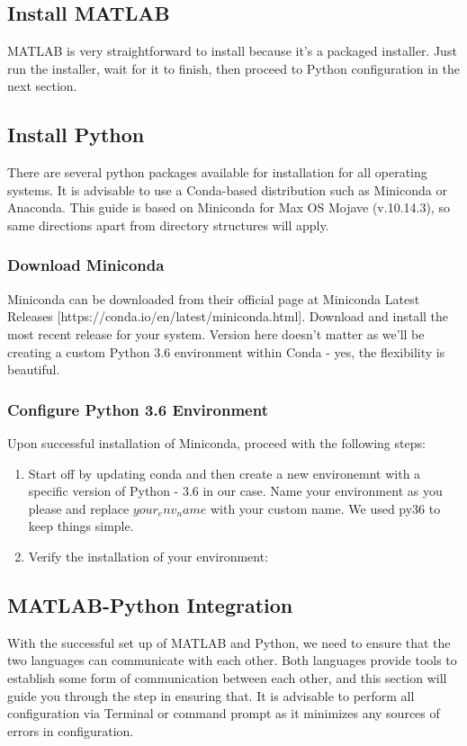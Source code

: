 \documentclass[12pt]{sop}
\begin{document}
\subsection{Install MATLAB}
MATLAB is very straightforward to install because it's a packaged installer. Just run the installer, wait for it to finish, then proceed to Python configuration in the next section.

\subsection{Install Python}
There are several python packages available for installation for all operating systems. It is advisable to use a Conda-based distribution such as Miniconda or Anaconda. This guide is based on Miniconda for Max OS Mojave (v.10.14.3), so same directions apart from directory structures will apply.

\subsubsection{Download Miniconda}
Miniconda can be downloaded from their official page at Miniconda Latest Releases [https://conda.io/en/latest/miniconda.html]. Download and install the most recent release for your system. Version here doesn't matter as we'll be creating a custom Python 3.6 environment within Conda - yes, the flexibility is beautiful.

\subsubsection{Configure Python 3.6 Environment}
Upon successful installation of Miniconda, proceed with the following steps:

\begin{enumerate}
\item Start off by updating conda and then create a new environemnt with a specific version of Python - 3.6 in our case. Name your environment as you please and replace $your_env_name$ with your custom name. We used py36 to keep things simple.
\item Verify the installation of your environment:
\end{enumerate}

\subsection{MATLAB-Python Integration}
With the successful set up of MATLAB and Python, we need to ensure that the two languages can communicate with each other. Both languages provide tools to establish some form of communication between each other, and this section will guide you through the step in ensuring that. It is advisable to perform all configuration via Terminal or command prompt as it minimizes any sources of errors in configuration.
\end{document}
